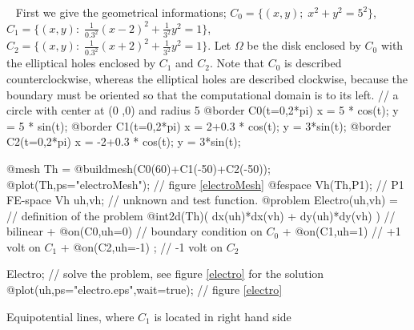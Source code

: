 \documentclass[a4paper,twoside,12pt]{book}
\begin{document}
\begin{example}~
First we give the geometrical informations; $C_0=\{(x,y);\; x^2+y^2=5^2\}$,
$C_1=\{(x,y):\; \frac{1}{0.3^2}(x-2)^2+\frac{1}{3^2}y^2=1\}$,
$C_2=\{(x,y):\; \frac{1}{0.3^2}(x+2)^2+\frac{1}{3^2}y^2=1\}$.
Let $\Omega$ be the disk enclosed by $C_0$ with the elliptical holes enclosed
by $C_1$ and $C_2$. Note that $C_0$ is described counterclockwise, whereas the
elliptical holes are described clockwise, because the boundary must be oriented so that the computational domain is to its left.
\bFF
// a circle with center at (0 ,0) and radius 5
@border C0(t=0,2*pi) { x = 5 * cos(t); y = 5 * sin(t); }
@border C1(t=0,2*pi) { x = 2+0.3 * cos(t); y = 3*sin(t); }
@border C2(t=0,2*pi) { x = -2+0.3 * cos(t); y = 3*sin(t); }

@mesh Th = @buildmesh(C0(60)+C1(-50)+C2(-50));
@plot(Th,ps="electroMesh"); // figure \ref{electroMesh}
@fespace Vh(Th,P1);     // P1 FE-space
Vh uh,vh;              // unknown and test function.
@problem Electro(uh,vh) =  //  definition of  the problem
    @int2d(Th)( dx(uh)*dx(vh) + dy(uh)*dy(vh) ) //  bilinear
    + @on(C0,uh=0)       //  boundary condition on $C_0$
    + @on(C1,uh=1)       //  +1 volt on $C_1$
    + @on(C2,uh=-1) ;    //  -1 volt on $C_2$

Electro; // solve the problem, see figure \ref{electro} for the solution
@plot(uh,ps="electro.eps",wait=true); // figure \ref{electro}
\eFF
\end{example}

{Equipotential lines, where $C_1$ is located in right hand side}

\end{document}
